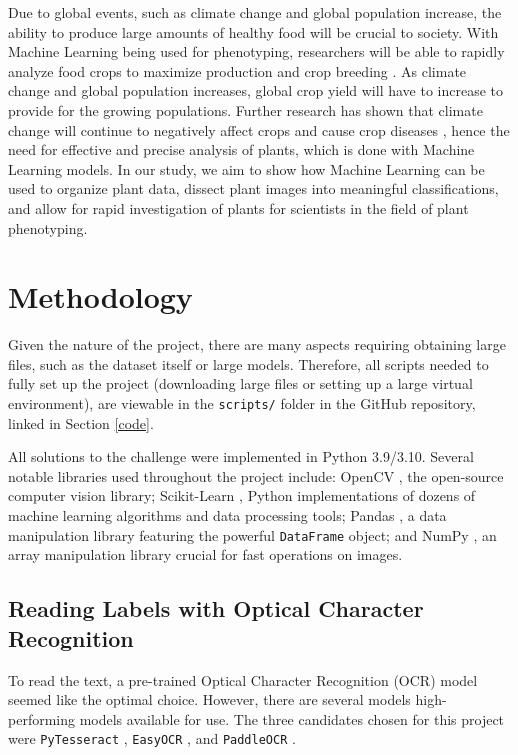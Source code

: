 \documentclass[final,5p,times,twocolumn,authoryear]{elsarticle}
\begin{document}
Due to global events, such as climate change and global population increase, the ability to produce large amounts of healthy food will be crucial to society. With Machine Learning being used for phenotyping, researchers will be able to rapidly analyze food crops to maximize production and crop breeding \citep{arya2022deep, shakoor2017high}.
As climate change and global population increases, global crop yield will have to increase to provide for the growing populations. Further research has shown that climate change will continue to negatively affect crops and cause crop diseases \citep{newton2011implications}, hence the need for effective and precise analysis of plants, which is done with Machine Learning models. In our study, we aim to show how Machine Learning can be used to organize plant data, dissect plant images into meaningful classifications, and allow for rapid investigation of plants for scientists in the field of plant phenotyping.

\section{Methodology}
\label{method}

Given the nature of the project, there are many aspects requiring obtaining large files, such as the dataset itself or large models. Therefore, all scripts needed to fully set up the project (downloading large files or setting up a large virtual environment), are viewable in the \verb|scripts/| folder in the GitHub repository, linked in Section \ref{code}.

All solutions to the challenge were implemented in Python 3.9/3.10. Several notable libraries used throughout the project include: OpenCV \citep{opencv_library}, the open-source computer vision library; Scikit-Learn \citep{scikit-learn}, Python implementations of dozens of machine learning algorithms and data processing tools; Pandas \citep{mckinney2010data}, a data manipulation library featuring the powerful \verb|DataFrame| object; and NumPy \citep{harris2020array}, an array manipulation library crucial for fast operations on images.

\subsection{Reading Labels with Optical Character Recognition}
\label{step_1}

To read the text, a pre-trained Optical Character Recognition (OCR) model seemed like the optimal choice. However, there are several models high-performing models available for use. The three candidates chosen for this project were \verb|PyTesseract| \citep{lee2017pytesseract}, \verb|EasyOCR| \citep{jaided2020easyocr}, and \verb|PaddleOCR| \citep{du2020ppocr}.
\end{document}
